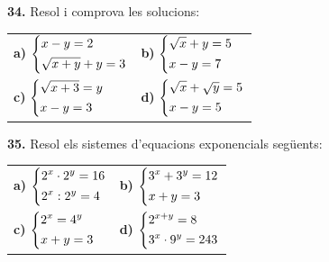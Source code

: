 \documentclass[13pt,a4paper]{extarticle}
\begin{document}
\par\noindent\begin{minipage}{\linewidth}
\textbf{34.} Resol i comprova les solucions:\par

\vspace{5pt}
\begin{tabular}{@{}p{.46\linewidth}p{.46\linewidth}@{}}
\textbf{a)} $\begin{dcases}x-y=2\\[1pt]\sqrt{x+y}+y=3\end{dcases}$ & \textbf{b)} $\begin{dcases}\sqrt{x}+y=5\\[1pt]x-y=7\end{dcases}$ \\[20pt]
\textbf{c)} $\begin{dcases}\sqrt{x+3}=y\\[1pt]x-y=3\end{dcases}$ & \textbf{d)} $\begin{dcases}\sqrt{x}+\sqrt{y}=5\\[1pt]x-y=5\end{dcases}$ \\[20pt]
\end{tabular}\par
\end{minipage}\par\vspace{1.6mm}
\par\noindent\begin{minipage}{\linewidth}
\textbf{35.} Resol els sistemes d'equacions exponencials següents:\par

\vspace{5pt}
\begin{tabular}{@{}p{.46\linewidth}p{.46\linewidth}@{}}
\textbf{a)} $\begin{dcases}2^x\cdot 2^y=16\\[1pt]2^x:2^y=4\end{dcases}$ & \textbf{b)} $\begin{dcases}3^x+3^y=12\\[1pt]x+y=3\end{dcases}$ \\[20pt]
\textbf{c)} $\begin{dcases}2^x=4^y\\[1pt]x+y=3\end{dcases}$ & \textbf{d)} $\begin{dcases}2^{x+y}=8\\[1pt]3^x\cdot 9^y=243\end{dcases}$ \\[20pt]
\end{tabular}\par
\end{minipage}\par\vspace{1.6mm}
\end{document}
